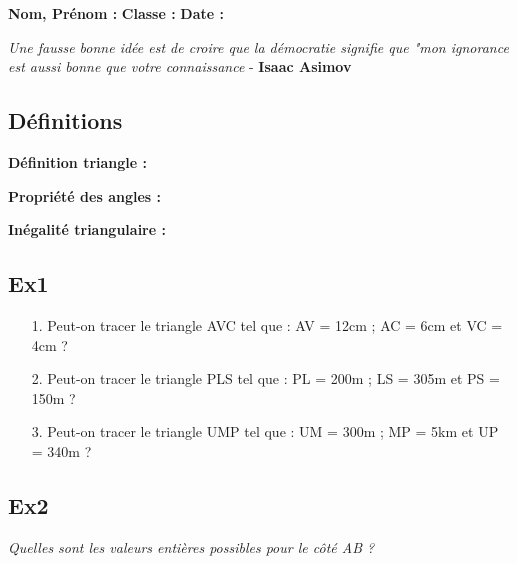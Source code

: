 



\textbf{Nom, Prénom :} \hspace{8cm} \textbf{Classe :} \hspace{3cm} \textbf{Date :}\\
\vspace{-0.8cm}
\begin{center}
  \textit{Une fausse bonne idée est de croire que la démocratie signifie que "mon ignorance est aussi bonne que votre connaissance}  - \textbf{Isaac Asimov}
\end{center}
\vspace{-0.8cm}

\subsection*{Définitions}

\textbf{Définition triangle :} \dotfill \\
\Pointilles[1]

\textbf{Propriété des angles :} \dotfill \\
\Pointilles[2]

\textbf{Inégalité triangulaire :} \dotfill \\
\Pointilles[2]


\subsection*{Ex1}

\begin{enumerate}
  \item[1.] Peut-on tracer le triangle AVC tel que : AV = 12cm ; AC = 6cm et VC = 4cm ? \\ \Pointilles[2] 
  \item[2.] Peut-on tracer le triangle PLS tel que : PL = 200m ; LS = 305m et PS = 150m ? \\ \Pointilles[2] 
  \item[3.] Peut-on tracer le triangle UMP tel que : UM = 300m ; MP = 5km et UP = 340m ? \\ \Pointilles[2] 
\end{enumerate} 


\subsection*{Ex2}
\textit{Quelles sont les valeurs entières possibles pour le côté AB ?}


